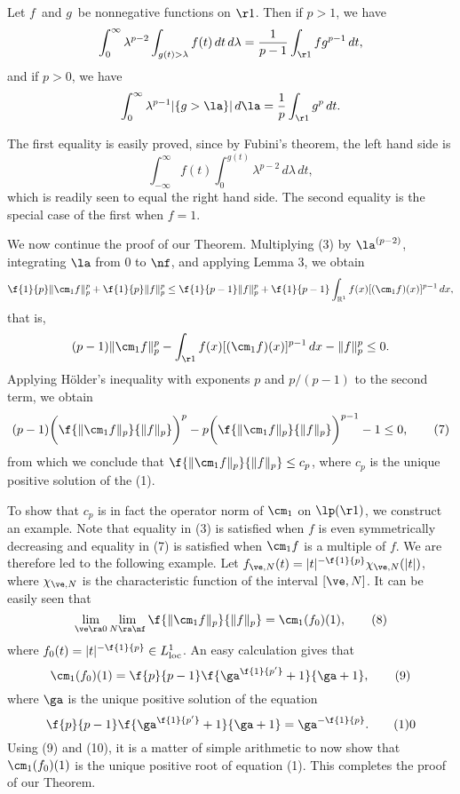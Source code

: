 Let $f$\ and $g$\ be nonnegative functions on $\r1$.
Then if $p>1$, we have
$$ \int_0^\infty \lambda^{p-2} \int_{g(t) > \lambda} f(t) \, dt \, d\lambda
   =
   \frac1{p-1} \int_{\r1} f g^{p-1} \,dt ,$$
and if $p>0$, we have
$$ \int_0^\infty \lambda^{p-1} |\{g>\la\}| \, d\la
   =
   \frac1p \int_{\r1} g^p \,dt .$$
\endproclaim

\noindent
The first equality is easily proved, since by Fubini's theorem,
the left hand
side is
$$ \int_{-\infty}^\infty f(t) \int_0^{g(t)} \lambda^{p-2} \,d\lambda \, dt ,$$
which is readily seen to equal the right hand side.
The second equality is the special case of the first when $f=1$.

\bigskip

We now continue the proof of our Theorem.
Multiplying (3) by $\la^{(p-2)}$, integrating $\la$ from
$0$ to $\nf$, and applying Lemma 3, we obtain
$$
\f{1}{p}\|\cm_1f\|^p_p +\f{1}{p}\|f\|^p_p \le
\f{1}{p-1}\|f\|_p^p + \f{1}{p-1}\int_{\Bbb R^1}
 f(x) [(\cm_1f)(x)]^{p-1}\, dx,
$$
that is,
$$
(p-1)\|\cm_1f\|_p^p - \int_{\r1} f(x)[(\cm_1f)(x)]^{p-1} \, dx - \|f\|_p^p
\le 0.
$$
Applying H\" older's inequality with exponents $p$ and $p/(p-1)$ to
the second term, we obtain
$$
(p-1)\bigg(\f{\|\cm_1f\|_p}{\|f\|_p}\bigg)^{p}-
p\bigg(\f{\|\cm_1f\|_p}{\|f\|_p}\bigg)^{p-1}-1 \le 0, \tag7
$$
from which we conclude that $\f{\|\cm_1f\|_p}{\|f\|_p}\le c_p$,
where $c_p$ is
the unique positive solution of the (1).

To show that $c_p$ is in fact the operator norm of $\cm_1$ on
$\lp (\r1)$, we construct an example. Note that equality in (3)
is satisfied when $f$ is even symmetrically decreasing and equality
in (7) is satisfied when $\cm_1f$ is a multiple of $f$. We
are therefore led to the following example.
Let $f_{\ve, N}(t) = |t|^{-\f{1}{p}} \chi_{ \ve ,
 N}(|t|)$, where
$\chi_{\ve , N}$ is the characteristic
function of the  interval $[\ve ,N]$.
It can be easily seen that
$$
\lim_{\ve \ra 0}\lim_{N \ra \nf }\f{\|\cm_1f\|_p}{\|f\|_p} =
\cm_1(f_0)(1),\tag8
$$
where $f_0(t)=|t|^{-\f{1}{p}} \in L^1_{\text{loc}}$. An easy
calculation gives that
$$
\cm_1(f_0)(1)= \f{p}{p-1} \f{\ga^{\f{1}{p^\prime}}+1}{\ga +1},\tag9
$$
where $\ga $ is the unique positive solution of  the equation
$$
\f{p}{p-1} \f{\ga^{\f{1}{p^\prime}}+1}{\ga +1}= \ga^{-\f{1}{p}}.\tag10
$$
Using (9) and (10), it is a matter of simple
arithmetic to now show that $\cm_1(f_0)(1)$
is the unique positive root of  equation (1).
This completes the proof of our Theorem.

\bigskip


